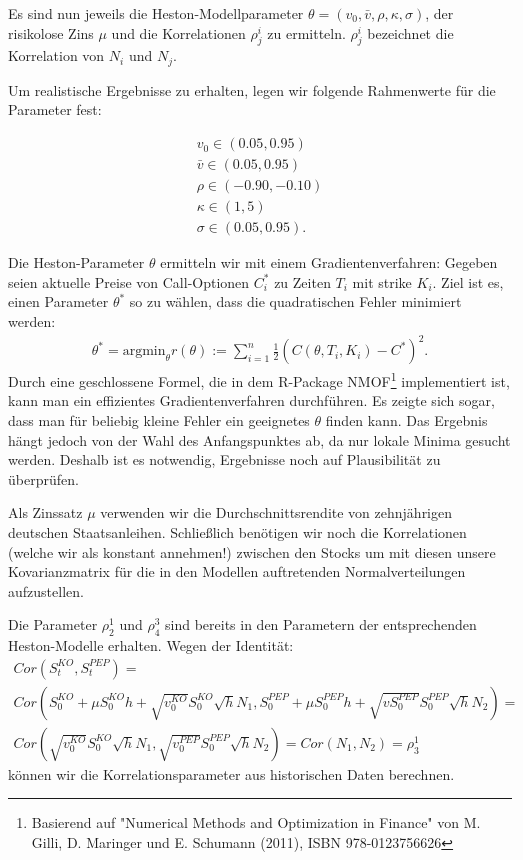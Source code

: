 \documentclass[12pt]{article}
\begin{document}
Es sind nun jeweils die Heston-Modellparameter $\theta=(v_0,\bar v, \rho, \kappa, \sigma)$, der risikolose Zins $\mu$ und die Korrelationen $\rho^i_j$ zu ermitteln. $\rho^{i}_j$ bezeichnet die Korrelation von $N_i$ und $N_j$.

Um realistische Ergebnisse zu erhalten, legen wir folgende Rahmenwerte für die Parameter fest:






\begin{gather*}
v_0 \in (0.05,0.95) \\
\bar v  \in (0.05,0.95) \\
\rho \in (-0.90,-0.10) \\
\kappa \in (1,5) \\
\sigma \in (0.05,0.95).
\end{gather*}




Die Heston-Parameter $\theta$ ermitteln wir mit einem Gradientenverfahren: Gegeben seien aktuelle Preise von Call-Optionen $C_i^*$ zu Zeiten $T_i$ mit strike $K_i$. Ziel ist es, einen Parameter $\theta^*$ so zu wählen, dass die quadratischen Fehler minimiert werden:
\begin{gather*}
\theta^*=\text{argmin}_{\theta} r(\theta):=\sum_{i=1}^n \frac12 (C(\theta,T_i,K_i)-C^*)^2.
\end{gather*}
Durch eine geschlossene Formel, die in dem R-Package \glqq NMOF\grqq\footnote{Basierend auf "Numerical Methods and Optimization in Finance" von M. Gilli, D. Maringer und E. Schumann (2011), ISBN 978-0123756626} implementiert ist, kann man ein effizientes Gradientenverfahren durchführen. Es zeigte sich sogar, dass man für beliebig kleine Fehler ein geeignetes $\theta$ finden kann. Das Ergebnis hängt jedoch von der Wahl des Anfangspunktes ab, da nur lokale Minima gesucht werden. Deshalb ist es notwendig, Ergebnisse noch auf Plausibilität zu überprüfen.

Als Zinssatz $\mu$ verwenden wir die Durchschnittsrendite von zehnjährigen deutschen Staatsanleihen. 
Schließlich benötigen wir noch die Korrelationen (welche wir als konstant annehmen!) zwischen den Stocks um mit diesen unsere Kovarianzmatrix für die in den Modellen auftretenden Normalverteilungen aufzustellen.

Die Parameter $\rho^1_2$ und $\rho^3_4$ sind bereits in den Parametern der entsprechenden Heston-Modelle erhalten. 
Wegen der Identität:
\begin{gather*}
Cor(S^{KO}_t,S^{PEP}_t)= \\
Cor\left(S^{KO}_0+\mu S^{KO}_0h+\sqrt{v^{KO}_0}S^{KO}_0\sqrt{h}N_1,S^{PEP}_0+\mu S^{PEP}_0h+\sqrt{vS^{PEP}_0}S^{PEP}_0\sqrt{h}N_2\right)= \\
Cor\left(\sqrt{v^{KO}_0}S^{KO}_0\sqrt{h}N_1,\sqrt{v^{PEP}_0}S^{PEP}_0\sqrt{h}N_2\right)=Cor(N_1,N_2)=\rho^1_3
\end{gather*}
können wir die Korrelationsparameter aus historischen Daten berechnen.
\end{document}
